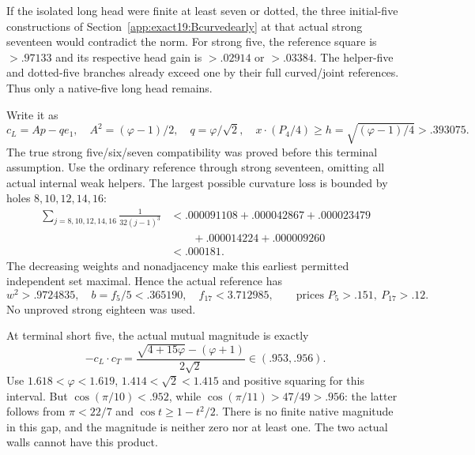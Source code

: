 \documentclass[11pt]{article}
\theoremstyle{definition}
\theoremstyle{remark}
\begin{document}
If the isolated long head were
finite at least seven or dotted,
the three initial-five constructions
of Section~\ref{app:exact19:Bcurvedearly}
at that actual strong seventeen
would contradict the norm.
For strong five, the reference
square is \(>.97133\) and its
respective head gain is
\(>.02914\) or \(>.03384\).
The helper-five and dotted-five
branches already exceed one by
their full curved/joint references.
Thus only a native-five long
head remains.

Write it as
\[
 c_L=Ap-qe_1,\quad
 A^2=(\varphi-1)/2,\quad q=\varphi/\sqrt2,\quad
          x\cdot(P_4/4)\ge h=\sqrt{(\varphi-1)/4}>.393075 .
\]
The true strong five/six/seven
compatibility was proved before
this terminal assumption.
Use the ordinary reference through
strong seventeen, omitting all
actual internal weak helpers.
The largest possible curvature
loss is bounded by holes
\(8,10,12,14,16\):
\[
\begin{aligned}
 \sum_{j=8,10,12,14,16}\frac1{32(j-1)^3}
 &<.000091108+.000042867+.000023479\\
 &\qquad+.000014224+.000009260\\
 &<.000181 .
\end{aligned}
\]
The decreasing weights and
nonadjacency make this earliest
permitted independent set maximal.
Hence the actual reference has
\[
 w^2>.9724835,\quad b=f_5/5<.365190,\quad
 f_{17}<3.712985,\qquad
                  \text{prices }P_5>.151,\ P_{17}>.12 .
\tag{B19tightref}\label{app:exact19:eq:Btightref}
\]
No unproved strong eighteen
was used.

At terminal short five, the actual
mutual magnitude is exactly
\[
 -c_L\cdot c_T=
       \frac{\sqrt{4+15\varphi}-(\varphi+1)}{2\sqrt2}
                                 \in(.953,.956).
\]
Use \(1.618<\varphi<1.619\),
\(1.414<\sqrt2<1.415\) and positive
squaring for this interval.
But \(\cos(\pi/10)<.952\), while
\(\cos(\pi/11)>47/49>.956\):
the latter follows from
\(\pi<22/7\) and
\(\cos t\ge1-t^2/2\).
There is no finite native magnitude
in this gap, and the magnitude is
neither zero nor at least one.
The two actual walls cannot have
this product.
\end{document}
